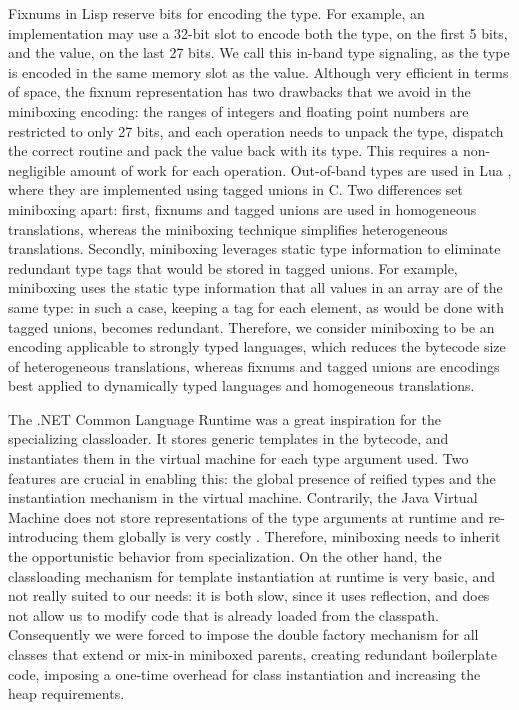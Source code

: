 Fixnums in Lisp \cite{fixnums-lisp} reserve bits for encoding the type. For example, an implementation may use a 32-bit slot to encode both the type, on the first 5 bits, and the value, on the last 27 bits. We call this in-band type signaling, as the type is encoded in the same memory slot as the value. Although very efficient in terms of space, the fixnum representation has two drawbacks that we avoid in the miniboxing encoding: the ranges of integers and floating point numbers are restricted to only 27 bits, and each operation needs to unpack the type, dispatch the correct routine and pack the value back with its type. This requires a non-negligible amount of work for each operation. Out-of-band types are used in Lua \cite{tagged-unions-lua}, where they are implemented using tagged unions in C. Two differences set miniboxing apart: first, fixnums and tagged unions are used in homogeneous translations, whereas the miniboxing technique simplifies heterogeneous translations. Secondly, miniboxing leverages static type information to eliminate redundant type tags that would be stored in tagged unions. For example, miniboxing uses the static type information that all values in an array are of the same type: in such a case, keeping a tag for each element, as would be done with tagged unions, becomes redundant. Therefore, we consider miniboxing to be an encoding applicable to strongly typed languages, which reduces the bytecode size of heterogeneous translations, whereas fixnums and tagged unions are encodings best applied to dynamically typed languages and homogeneous translations.

The .NET Common Language Runtime \cite{ecma-dotnet, dot-net-generics} was a great inspiration for the specializing classloader. It stores generic templates in the bytecode, and instantiates them in the virtual machine for each type argument used. Two features are crucial in enabling this: the global presence of reified types and the instantiation mechanism in the virtual machine. Contrarily, the Java Virtual Machine does not store representations of the type arguments at runtime \cite{java-erasure} and re-introducing them globally is very costly \cite{michel-thesis}. Therefore, miniboxing needs to inherit the opportunistic behavior from specialization. On the other hand, the classloading mechanism for template instantiation at runtime is very basic, and not really suited to our needs: it is both slow, since it uses reflection, and does not allow us to modify code that is already loaded from the classpath. Consequently we were forced to impose the double factory mechanism for all classes that extend or mix-in miniboxed parents, creating redundant boilerplate code, imposing a one-time overhead for class instantiation and increasing the heap requirements.  

